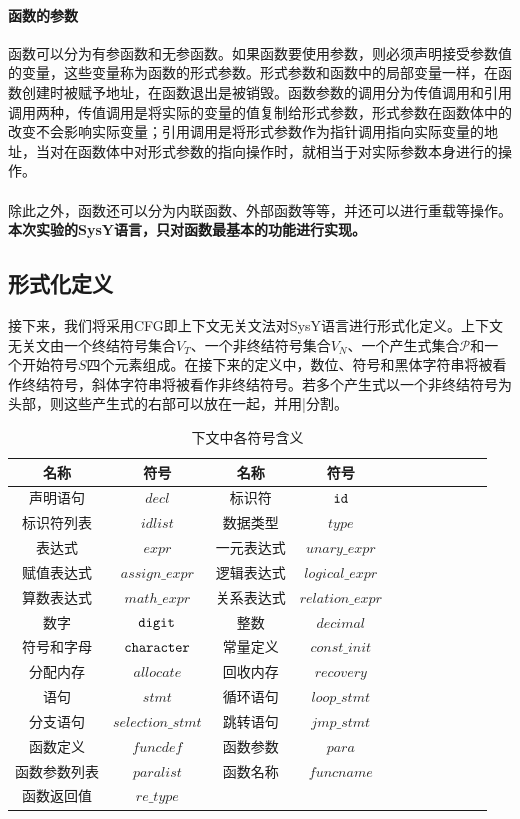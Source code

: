 \documentclass[UTF8,a4paper,10pt]{ctexart}
\begin{document}
\paragraph{函数的参数}
函数可以分为有参函数和无参函数。如果函数要使用参数，则必须声明接受参数值的变量，这些变量称为函数的形式参数。形式参数和函数中的局部变量一样，在函数创建时被赋予地址，在函数退出是被销毁。函数参数的调用分为传值调用和引用调用两种，传值调用是将实际的变量的值复制给形式参数，形式参数在函数体中的改变不会影响实际变量；引用调用是将形式参数作为指针调用指向实际变量的地址，当对在函数体中对形式参数的指向操作时，就相当于对实际参数本身进行的操作。\\
\\
除此之外，函数还可以分为内联函数、外部函数等等，并还可以进行重载等操作。\textbf{本次实验的SysY语言，只对函数最基本的功能进行实现。}
\subsection{形式化定义}
接下来，我们将采用CFG即上下文无关文法对SysY语言进行形式化定义。上下文无关文由一个终结符号集合$V_T$、一个非终结符号集合$V_N$、一个产生式集合$\mathscr{P}$和一个开始符号$S$四个元素组成。在接下来的定义中，数位、符号和黑体字符串将被看作终结符号，斜体字符串将被看作非终结符号。若多个产生式以一个非终结符号为头部，则这些产生式的右部可以放在一起，并用|分割。
\begin{table}[!htbp]
  \centering
  \begin{tabular}{ccccccccccc}
  \toprule  
  名称& 符号& 名称& 符号&\\
  \midrule
  声明语句& $decl$& 标识符& $\tt{id}$\\
  标识符列表& $idlist$&数据类型& $type$\\
  表达式&$expr$&一元表达式&$unary\_expr$\\
  赋值表达式&$assign\_expr$&逻辑表达式&$logical\_expr$\\
  算数表达式&$math\_expr$&关系表达式&$relation\_expr$\\
  数字&$\tt{digit}$&整数&$decimal$\\
  符号和字母&$\tt{character}$&常量定义&$const\_init$\\
  分配内存& $allocate$& 回收内存& $recovery$\\
  语句& $stmt$& 循环语句& $loop\_stmt$\\
  分支语句& $selection\_stmt$& 跳转语句& $jmp\_stmt$\\
  函数定义& $funcdef$& 函数参数& $para$\\
  函数参数列表& $paralist$& 函数名称& $funcname$\\
  函数返回值& $re\_type$\\
  \bottomrule
  \end{tabular}
  \caption{下文中各符号含义}
\end{table}
\end{document}

